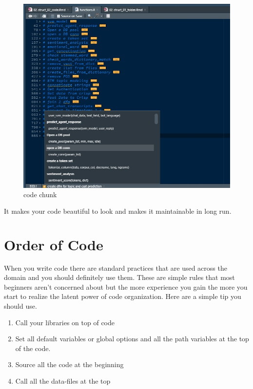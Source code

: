 \documentclass[
]{book}
\providecommand{\tightlist}{%
  \setlength{\itemsep}{0pt}\setlength{\parskip}{0pt}}
\begin{document}
\begin{figure}
\centering
\includegraphics{./figures/scrn_sections.jpg}
\caption{code chunk}
\end{figure}

It makes your code beautiful to look and makes it maintainable in long run.

\hypertarget{order-of-code}{%
\section{Order of Code}\label{order-of-code}}

When you write code there are standard practices that are used across the domain and you should definitely use them. These are simple rules that most beginners aren't concerned about but the more experience you gain the more you start to realize the latent power of code organization. Here are a simple tip you should use.

\begin{enumerate}
\def\labelenumi{\arabic{enumi}.}
\tightlist
\item
  Call your libraries on top of code
\item
  Set all default variables or global options and all the path variables at the top of the code.
\item
  Source all the code at the beginning
\item
  Call all the data-files at the top
\end{enumerate}
\end{document}

